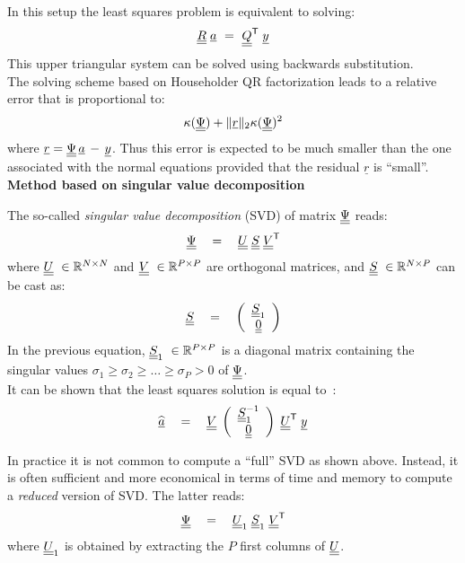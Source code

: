 {In this setup the least squares problem is equivalent to solving:
$$
\underline{\underline{R}} \; \underline{a} \, \, = \, \, \underline{\underline{Q}}^{\mbox{\scriptsize \textsf{T}}} \; \underline{y}
$$
This upper triangular system can be solved using backwards substitution. \\

The solving scheme based on Householder QR factorization leads to a relative error that is proportional to:
$$\kappa(\underline{\underline{\Psi}}) + \|\underline{r}\|_2 \kappa(\underline{\underline{\Psi}})^2$$
where $\underline{r} = \underline{\underline{\Psi}} \, \underline{a} \, - \, \underline{y}$.  Thus this error is expected to be much smaller than the one associated with the normal equations provided that the residual $\underline{r}$ is ``small''. \\

\textbf{Method based on singular value decomposition} \vspace{2mm}

The so-called \emph{singular value decomposition} (SVD) of matrix $\underline{\underline{\Psi}}$ reads:
$$
\underline{\underline{\Psi}} \quad = \quad \underline{\underline{U}} \; \underline{\underline{S}} \; \underline{\underline{V}}^{\mbox{\scriptsize \textsf{T}}}
$$
where $\underline{\underline{U}}~\in \mathbb{R}^{N \times N}$ and $\underline{\underline{V}}~\in \mathbb{R}^{P \times P}$ are orthogonal matrices, and $\underline{\underline{S}}~\in \mathbb{R}^{N \times P}$ can be cast as:
$$
\underline{\underline{S}} \quad = \quad \left( 
\begin{array}{c}
\underline{\underline{S}}_1 \\
\underline{\underline{0}} \\ 
\end{array}
\right)
$$
In the previous equation, $\underline{\underline{S}}_1~\in \mathbb{R}^{P \times P}$ is a diagonal matrix containing the singular values $\sigma_1 \geq \sigma_2 \geq \dots \geq \sigma_P > 0$ of $\underline{\underline{\Psi}}$. \\

It can be shown that the least squares solution is equal to~:
$$
\widehat{\underline{a}} \quad = \quad \underline{\underline{V}} \; \left( \begin{array}{c}
\underline{\underline{S}}_1^{-1} \\
\underline{\underline{0}}  \\ 
 \end{array}\right)
\; \underline{\underline{U}}^{\mbox{\scriptsize \textsf{T}}} \; \underline{y}
$$

In practice it is not common to compute a ``full'' SVD as shown above. Instead, it is often sufficient and more economical in terms of time and memory to compute a \emph{reduced} version of SVD. The latter reads:
$$
\underline{\underline{\Psi}} \quad = \quad \underline{\underline{U}}_1 \; \underline{\underline{S}}_1 \; \underline{\underline{V}}^{\mbox{\scriptsize \textsf{T}}}
$$ 
where $\underline{\underline{U}}_1$ is obtained by extracting the $P$ first columns of $\underline{\underline{U}}$.\\

}
